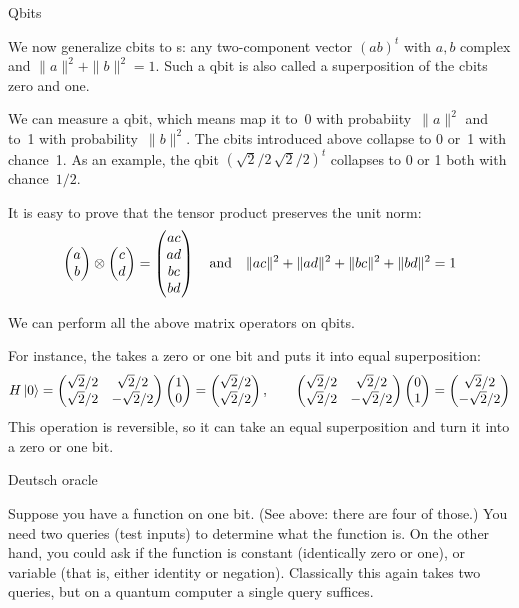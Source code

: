  {Qbits}

We now generalize cbits to s: any two-component
vector $(a b)^t$ with $a,b$ complex and
$\|a\|^2+\|b\|^2=1$. Such a qbit is also called a superposition of the
cbits zero and one.

We can measure a qbit, which means map it to~0 with
probabiity~$\|a\|^2$ and to~1 with probability~$\|b\|^2$.
The cbits introduced above collapse to 0 or~1 with chance~1.
As an example, the qbit
$(\sqrt{2}/2\, \sqrt{2}/2)^t$ collapses to 0 or 1 both with chance~$1/2$.

It is easy to prove that the tensor product preserves the unit norm:
\[ 
\begin{pmatrix}
  a\\b
\end{pmatrix}
\otimes
\begin{pmatrix}
  c\\d
\end{pmatrix}
=
\begin{pmatrix}
  ac\\ad\\bc\\bd
\end{pmatrix}
\quad\hbox{and}\quad
\|ac\|^2+\|ad\|^2+\|bc\|^2+\|bd\|^2=1
\]

We can perform all the above matrix operators on qbits.

For instance, the  takes a zero or one bit
and puts it into equal superposition:
\[ H\left|0\right\rangle =
\begin{pmatrix}
  \sqrt{2}/2&\sqrt{2}/2\\ \sqrt{2}/2&-\sqrt{2}/2
\end{pmatrix}
\begin{pmatrix}
  1\\0
\end{pmatrix}
=
\begin{pmatrix}
  \sqrt{2}/2\\ \sqrt{2}/2
\end{pmatrix}
,\qquad
\begin{pmatrix}
  \sqrt{2}/2&\sqrt{2}/2\\ \sqrt{2}/2&-\sqrt{2}/2
\end{pmatrix}
\begin{pmatrix}
  0\\1
\end{pmatrix}
=
\begin{pmatrix}
  \sqrt{2}/2\\ -\sqrt{2}/2
\end{pmatrix}
\]
This operation is reversible, so it can take an equal superposition
and turn it into a zero or one bit.

 {Deutsch oracle}

Suppose you have a function on one bit. (See above: there are four of
those.) You need two queries (test inputs) to determine what the
function is. On the other hand, you could ask if the function is
constant (identically zero or one), or variable (that is, either
identity or negation). Classically this again takes two queries, but
on a quantum computer a single query suffices.

